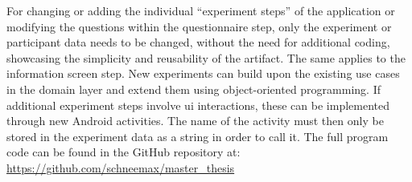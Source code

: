 
For changing or adding the individual \enquote{experiment steps} of the application or modifying the questions within the questionnaire step, only the experiment or participant data needs to be changed, without the need for additional coding, showcasing the simplicity and reusability of the artifact. The same applies to the information screen step. New experiments can build upon the existing use cases in the domain layer and extend them using object-oriented programming. If additional experiment steps involve \ac{ui} interactions, these can be implemented through new Android activities. The name of the activity must then only be stored in the experiment data as a string in order to call it. The full program code can be found in the GitHub repository at: \url{https://github.com/schneemax/master_thesis}
